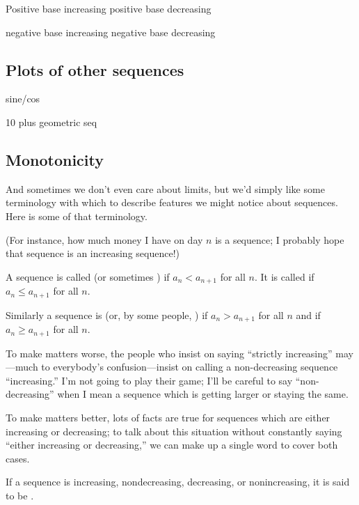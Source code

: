 \documentclass{ximera}
\begin{document}
Positive base increasing
positive base decreasing

negative base increasing
negative base decreasing


\subsection{Plots of other sequences}

sine/cos

10 plus  geometric seq



\subsection{Monotonicity}

And sometimes we don't even care about limits, but we'd simply like
some terminology with which to describe features we might notice about
sequences.  Here is some of that terminology.

(For instance, how much money I have on day $n$ is a sequence; I
probably hope that sequence is an increasing sequence!)

\begin{definition}
  A sequence is called  (or
  sometimes ) if $ a_n<a_{n+1}$ for all $n$.
  It is called  if $
  a_n\le a_{n+1}$ for all $n$.

  Similarly a sequence is 
  (or, by some people, ) if $ a_n>a_{n+1}$
  for all $n$ and  if
  $ a_n\ge a_{n+1}$ for all $n$.
\end{definition}
To make matters worse, the people who insist on saying ``strictly
increasing'' may---much to everybody's confusion---insist on calling a
non-decreasing sequence ``increasing.'' I'm not going to play their
game; I'll be careful to say ``non-decreasing'' when I mean a sequence
which is getting larger or staying the same.

To make matters better, lots of facts are true for sequences which are
either increasing or decreasing; to talk about this situation without
constantly saying ``either increasing or decreasing,'' we can make up
a single word to cover both cases.
\begin{definition}
  If a sequence is increasing, nondecreasing, decreasing, or
  nonincreasing, it is said to be .
\end{definition}
\end{document}

